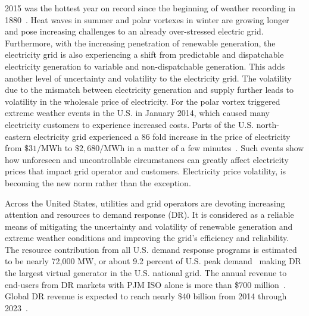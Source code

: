 

2015 was the hottest year on record since the beginning of weather recording in 1880~\cite{noaa}. 
Heat waves in summer and polar vortexes in winter are growing longer and pose increasing challenges to an already over-stressed electric grid. 
Furthermore, with the increasing penetration of renewable generation, the electricity grid is also experiencing a shift from predictable and dispatchable electricity generation to variable and non-dispatchable generation. 
This adds another level of uncertainty and volatility to the electricity grid.
The volatility due to the mismatch between electricity generation and supply further leads to volatility in the wholesale price of electricity.
For \eg the polar vortex triggered extreme weather events in the U.S. in January 2014, which caused many electricity customers to experience increased costs.
Parts of the U.S. north-eastern electricity grid experienced a 86 fold increase in the price of electricity from $\$31/\si{\mega\watt\hour}$ to $\$2,680/\si{\mega\watt\hour}$ in a matter of a few minutes~\cite{volatility}. 
Such events show how unforeseen and uncontrollable circumstances can greatly affect electricity prices that impact grid operator and customers. 
Electricity price volatility, is becoming the new norm rather than the exception.

Across the United States, utilities and grid operators are devoting increasing attention and resources to demand response (DR). It is considered as a reliable means of mitigating the uncertainty and volatility of renewable generation and extreme weather conditions and improving the grid's efficiency and reliability.
The resource contribution from all U.S. demand response programs is estimated to be nearly 72,000 MW, or about 9.2 percent of U.S. peak demand~\cite{federal2008assessment} making DR the largest virtual generator in the U.S. national grid.
The annual revenue to end-users from DR markets with PJM ISO alone is more than \$700 million~\cite{pjm}. 
Global DR revenue is expected to reach nearly \$40 billion from 2014 through 2023~\cite{navigant}.

